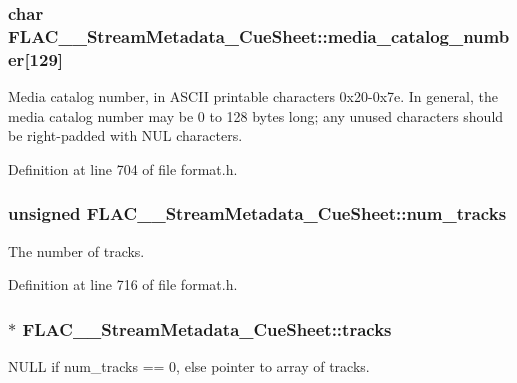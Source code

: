 \subsubsection[{\texorpdfstring{media\+\_\+catalog\+\_\+number}{media_catalog_number}}]{\setlength{\rightskip}{0pt plus 5cm}char F\+L\+A\+C\+\_\+\+\_\+\+Stream\+Metadata\+\_\+\+Cue\+Sheet\+::media\+\_\+catalog\+\_\+number\mbox{[}129\mbox{]}}\hypertarget{struct_f_l_a_c_____stream_metadata___cue_sheet_a776e6057ac7939fba52edecd44ec45bc}{}\label{struct_f_l_a_c_____stream_metadata___cue_sheet_a776e6057ac7939fba52edecd44ec45bc}
Media catalog number, in A\+S\+C\+II printable characters 0x20-\/0x7e. In general, the media catalog number may be 0 to 128 bytes long; any unused characters should be right-\/padded with N\+UL characters. 

Definition at line 704 of file format.\+h.

\subsubsection[{\texorpdfstring{num\+\_\+tracks}{num_tracks}}]{\setlength{\rightskip}{0pt plus 5cm}unsigned F\+L\+A\+C\+\_\+\+\_\+\+Stream\+Metadata\+\_\+\+Cue\+Sheet\+::num\+\_\+tracks}\hypertarget{struct_f_l_a_c_____stream_metadata___cue_sheet_a6924f26a8e8fa9023f23539b959fe2ae}{}\label{struct_f_l_a_c_____stream_metadata___cue_sheet_a6924f26a8e8fa9023f23539b959fe2ae}
The number of tracks. 

Definition at line 716 of file format.\+h.

\subsubsection[{\texorpdfstring{tracks}{tracks}}]{$\ast$ F\+L\+A\+C\+\_\+\+\_\+\+Stream\+Metadata\+\_\+\+Cue\+Sheet\+::tracks}\hypertarget{struct_f_l_a_c_____stream_metadata___cue_sheet_a5c0c3440b01b773684d56aeb1e424fab}{}\label{struct_f_l_a_c_____stream_metadata___cue_sheet_a5c0c3440b01b773684d56aeb1e424fab}
N\+U\+LL if num\+\_\+tracks == 0, else pointer to array of tracks. 

